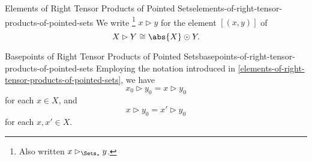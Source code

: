 \begin{notation}{Elements of Right Tensor Products of Pointed Sets}{elements-of-right-tensor-products-of-pointed-sets}%
    We write%
    \footnote{%
        Also written $x\rhd_{\Sets_{*}}y$.
        \par\vspace*{\TCBBoxCorrection}
    } %
    $x\rhd y$ for the element $[(x,y)]$ of
    \[
        X\rhd Y%
        \cong%
        \abs{X}\odot Y.%
    \]%
\end{notation}
\begin{remark}{Basepoints of Right Tensor Products of Pointed Sets}{basepoints-of-right-tensor-products-of-pointed-sets}%
    Employing the notation introduced in \cref{elements-of-right-tensor-products-of-pointed-sets}, we have
    \[
        x_{0}\rhd y_{0}%
        =%
        x\rhd y_{0}%
    \]%
    for each $x\in X$, and
    \[
        x\rhd y_{0}%
        =%
        x'\rhd y_{0}%
    \]%
    for each $x,x'\in X$.
\end{remark}
